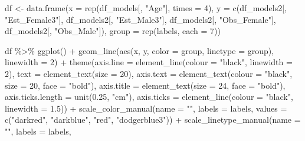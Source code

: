 \documentclass[
  letterpaper,
  DIV=11,
  numbers=noendperiod]{scrreprt}
\newenvironment{Shaded}{\begin{snugshade}}{\end{snugshade}}
\newcommand{\AttributeTok}[1]{\textcolor[rgb]{0.40,0.45,0.13}{#1}}
\newcommand{\DecValTok}[1]{\textcolor[rgb]{0.68,0.00,0.00}{#1}}
\newcommand{\FloatTok}[1]{\textcolor[rgb]{0.68,0.00,0.00}{#1}}
\newcommand{\FunctionTok}[1]{\textcolor[rgb]{0.28,0.35,0.67}{#1}}
\newcommand{\NormalTok}[1]{\textcolor[rgb]{0.00,0.23,0.31}{#1}}
\newcommand{\OtherTok}[1]{\textcolor[rgb]{0.00,0.23,0.31}{#1}}
\newcommand{\SpecialCharTok}[1]{\textcolor[rgb]{0.37,0.37,0.37}{#1}}
\newcommand{\StringTok}[1]{\textcolor[rgb]{0.13,0.47,0.30}{#1}}
\begin{document}
\begin{Shaded}
\begin{Highlighting}[]
\NormalTok{df }\OtherTok{\textless{}{-}} \FunctionTok{data.frame}\NormalTok{(}\AttributeTok{x =} \FunctionTok{rep}\NormalTok{(df\_models[, }\StringTok{"Age"}\NormalTok{], }\AttributeTok{times =} \DecValTok{4}\NormalTok{), }\AttributeTok{y =} \FunctionTok{c}\NormalTok{(df\_models2[, }\StringTok{"Est\_Female3"}\NormalTok{],}
\NormalTok{    df\_models2[, }\StringTok{"Est\_Male3"}\NormalTok{], df\_models2[, }\StringTok{"Obs\_Female"}\NormalTok{], df\_models2[, }\StringTok{"Obs\_Male"}\NormalTok{]),}
    \AttributeTok{group =} \FunctionTok{rep}\NormalTok{(labels, }\AttributeTok{each =} \DecValTok{7}\NormalTok{))}

\NormalTok{df }\SpecialCharTok{\%\textgreater{}\%}
    \FunctionTok{ggplot}\NormalTok{() }\SpecialCharTok{+} \FunctionTok{geom\_line}\NormalTok{(}\FunctionTok{aes}\NormalTok{(x, y, }\AttributeTok{color =}\NormalTok{ group, }\AttributeTok{linetype =}\NormalTok{ group), }\AttributeTok{linewidth =} \DecValTok{2}\NormalTok{) }\SpecialCharTok{+}
    \FunctionTok{theme}\NormalTok{(}\AttributeTok{axis.line =} \FunctionTok{element\_line}\NormalTok{(}\AttributeTok{colour =} \StringTok{"black"}\NormalTok{, }\AttributeTok{linewidth =} \DecValTok{2}\NormalTok{), }\AttributeTok{text =} \FunctionTok{element\_text}\NormalTok{(}\AttributeTok{size =} \DecValTok{20}\NormalTok{),}
        \AttributeTok{axis.text =} \FunctionTok{element\_text}\NormalTok{(}\AttributeTok{colour =} \StringTok{"black"}\NormalTok{, }\AttributeTok{size =} \DecValTok{20}\NormalTok{, }\AttributeTok{face =} \StringTok{"bold"}\NormalTok{), }\AttributeTok{axis.title =} \FunctionTok{element\_text}\NormalTok{(}\AttributeTok{size =} \DecValTok{24}\NormalTok{,}
            \AttributeTok{face =} \StringTok{"bold"}\NormalTok{), }\AttributeTok{axis.ticks.length =} \FunctionTok{unit}\NormalTok{(}\FloatTok{0.25}\NormalTok{, }\StringTok{"cm"}\NormalTok{), }\AttributeTok{axis.ticks =} \FunctionTok{element\_line}\NormalTok{(}\AttributeTok{colour =} \StringTok{"black"}\NormalTok{,}
            \AttributeTok{linewidth =} \FloatTok{1.5}\NormalTok{)) }\SpecialCharTok{+} \FunctionTok{scale\_color\_manual}\NormalTok{(}\AttributeTok{name =} \StringTok{""}\NormalTok{, }\AttributeTok{labels =}\NormalTok{ labels, }\AttributeTok{values =} \FunctionTok{c}\NormalTok{(}\StringTok{"darkred"}\NormalTok{,}
    \StringTok{"darkblue"}\NormalTok{, }\StringTok{"red"}\NormalTok{, }\StringTok{"dodgerblue3"}\NormalTok{)) }\SpecialCharTok{+} \FunctionTok{scale\_linetype\_manual}\NormalTok{(}\AttributeTok{name =} \StringTok{""}\NormalTok{, }\AttributeTok{labels =}\NormalTok{ labels,}

\end{Highlighting}
\end{Shaded}
\end{document}
